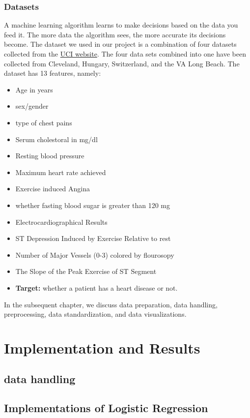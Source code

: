 \subsubsection{Datasets}
A machine learning algorithm learns to make decisions based on the data you feed it. The more data the algorithm sees, the more accurate its decisions become. The dataset we used in our project is a combination of four datasets collected from the \href{https://archive.ics.uci.edu/ml/datasets/heart+disease}{UCI website}. The four data sets combined into one have been collected from Cleveland, Hungary, Switzerland, and the VA Long Beach. The dataset has 13 features, namely:
\begin{itemize}
    \item Age in years
    \item sex/gender
    \item type of chest pains
    \item Serum cholestoral in mg/dl
    \item Resting blood pressure
    \item Maximum heart rate achieved
    \item Exercise induced Angina
    \item whether fasting blood sugar is greater than 120 mg
    \item Electrocardiographical Results
    \item ST Depression Induced by Exercise Relative to rest
    \item Number of Major Vessels (0-3) colored by flourosopy
    \item The Slope of the Peak Exercise of ST Segment
    \item \textbf{Target:} whether a patient has a heart disease or not.
\end{itemize}
In the subsequent chapter, we discuss data preparation, data handling, preprocessing, data standardization, and data visualizations.




\newpage
\section{Implementation and Results}
\subsection{data handling}

\subsection{Implementations of Logistic Regression}

